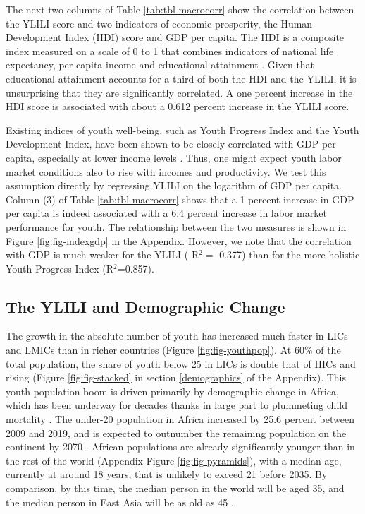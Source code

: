 \documentclass[
  a4paper, twoside, 12pt]{book}
\begin{document}
The next two columns of Table \ref{tab:tbl-macrocorr} show the correlation between the YLILI score and two indicators of economic prosperity, the Human Development Index (HDI) score and GDP per capita. The HDI is a composite index measured on a scale of 0 to 1 that combines indicators of national life expectancy, per capita income and educational attainment \autocite{undp1990}. Given that educational attainment accounts for a third of both the HDI and the YLILI, it is unsurprising that they are significantly correlated. A one percent increase in the HDI score is associated with about a 0.612 percent increase in the YLILI score.

Existing indices of youth well-being, such as Youth Progress Index and the Youth Development Index, have been shown to be closely correlated with GDP per capita, especially at lower income levels \autocite{sen2016,lisney2018}. Thus, one might expect youth labor market conditions also to rise with incomes and productivity. We test this assumption directly by regressing YLILI on the logarithm of GDP per capita. Column (3) of Table \ref{tab:tbl-macrocorr} shows that a 1 percent increase in GDP per capita is indeed associated with a 6.4 percent increase in labor market performance for youth. The relationship between the two measures is shown in Figure \ref{fig:fig-indexgdp} in the Appendix. However, we note that the correlation with GDP is much weaker for the YLILI ( R\(^2=\) 0.377) than for the more holistic Youth Progress Index (R\(^2\)=0.857).

\hypertarget{the-ylili-and-demographic-change}{%
\subsection{The YLILI and Demographic Change}\label{the-ylili-and-demographic-change}}

The growth in the absolute number of youth has increased much faster in LICs and LMICs than in richer countries (Figure \ref{fig:fig-youthpop}). At 60\% of the total population, the share of youth below 25 in LICs is double that of HICs and rising (Figure \ref{fig:fig-stacked} in section \ref{demographics} of the Appendix). This youth population boom is driven primarily by demographic change in Africa, which has been underway for decades thanks in large part to plummeting child mortality \autocite{ortiz-ospina2016}. The under-20 population in Africa increased by 25.6 percent between 2009 and 2019, and is expected to outnumber the remaining population on the continent by 2070 \autocite{africandevelopmentbank2019}. African populations are already significantly younger than in the rest of the world (Appendix Figure \ref{fig:fig-pyramids}), with a median age, currently at around 18 years, that is unlikely to exceed 21 before 2035. By comparison, by this time, the median person in the world will be aged 35, and the median person in East Asia will be as old as 45 \autocite{filmer2014}.
\end{document}

